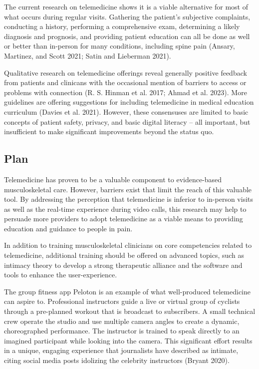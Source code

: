 \documentclass[
  letterpaper,
  DIV=11,
  numbers=noendperiod,
  oneside]{scrartcl}
\begin{document}
The current research on telemedicine shows it is a viable alternative
for most of what occurs during regular visits. Gathering the patient's
subjective complaints, conducting a history, performing a comprehensive
exam, determining a likely diagnosis and prognosis, and providing
patient education can all be done as well or better than in-person for
many conditions, including spine pain (Ansary, Martinez, and Scott 2021;
Satin and Lieberman 2021).

Qualitative research on telemedicine offerings reveal generally positive
feedback from patients and clinicans with the occasional mention of
barriers to access or problems with connection (R. S. Hinman et al.
2017; Ahmad et al. 2023). More guidelines are offering suggestions for
including telemedicine in medical education curriculum (Davies et al.
2021). However, these consensuses are limited to basic concepts of
patient safety, privacy, and basic digital literacy -- all important,
but insufficient to make significant improvements beyond the status quo.

\subsection{Plan}\label{plan}

Telemedicine has proven to be a valuable component to evidence-based
musculoskeletal care. However, barriers exist that limit the reach of
this valuable tool. By addressing the perception that telemedicine is
inferior to in-person visits as well as the real-time experience during
video calls, this research may help to persuade more providers to adopt
telemedicine as a viable means to providing education and guidance to
people in pain.

In addition to training musculoskeletal clinicians on core competencies
related to telemedicine, additional training should be offered on
advanced topics, such as intimacy theory to develop a strong therapeutic
alliance and the software and tools to enhance the user-experience.

The group fitness app Peloton is an example of what well-produced
telemedicine can aspire to. Professional instructors guide a live or
virtual group of cyclists through a pre-planned workout that is
broadcast to subscribers. A small technical crew operate the studio and
use multiple camera angles to create a dynamic, choreographed
performance. The instructor is trained to speak directly to an imagined
participant while looking into the camera. This significant effort
results in a unique, engaging experience that journalists have described
as intimate, citing social media posts idolizing the celebrity
instructors (Bryant 2020).
\end{document}
